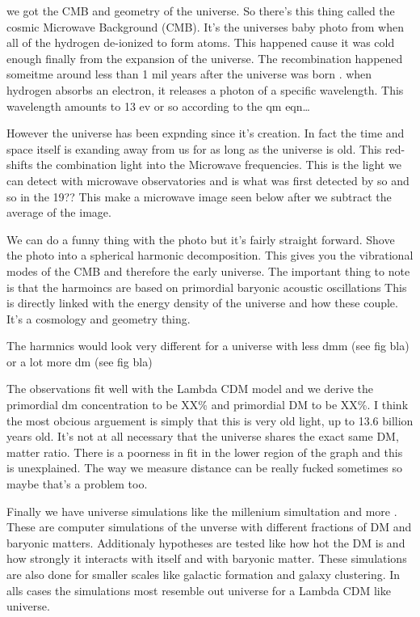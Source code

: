 we got the CMB and geometry of the universe.
So there's this thing called the cosmic Microwave Background (CMB).
It's the universes baby photo from when all of the hydrogen de-ionized to form atoms.
This happened cause it was cold enough finally from the expansion of the universe.
The recombination happened someitme around less than 1 mil years after the universe was born \fu \ns.
when hydrogen absorbs an electron, it releases a photon of a specific wavelength.
This wavelength amounts to 13 ev or so according to the qm eqn\dots


However the universe has been expnding since it's creation.
In fact the time and space itself is exanding away from us for as long as the universe is old.
This red-shifts the combination light into the Microwave frequencies.
This is the light we can detect with microwave observatories and is what was first detected by so and so in the 19?? \ns \fu
This make a microwave image seen below after we subtract the average of the image.


We can do a funny thing with the photo but it's fairly straight forward.
Shove the photo into a spherical harmonic decomposition.
This gives you the vibrational modes of the CMB and therefore the early universe.
The important thing to note is that the harmoincs are based on primordial baryonic acoustic oscillations \fu
This is directly linked with the energy density of the universe and how these couple.
It's a cosmology and geometry thing.


The harmnics would look very different for a universe with less dmm (see fig bla) or a lot more dm (see fig bla)


The observations fit well with the Lambda CDM model and we derive the primordial dm concentration to be XX\% and primordial DM to be XX\%.
 I think the most obcious arguement is simply that this is very old light, up to 13.6 billion years old.
It's not at all necessary that the universe shares the exact same DM, matter ratio.
There is a poorness in fit in the lower region of the graph and this is unexplained.
The way we measure distance can be really fucked sometimes so maybe that's a problem too.

Finally we have universe simulations like the millenium simultation and more \fu \ns.
These are computer simulations of the unverse with different fractions of DM and baryonic matters.
Additionaly hypotheses are tested like how hot the DM is and how strongly it interacts with itself and with baryonic matter.
These simulations are also done for smaller scales like galactic formation and galaxy clustering.
In alls cases the simulations most resemble out universe for a Lambda CDM like universe.

